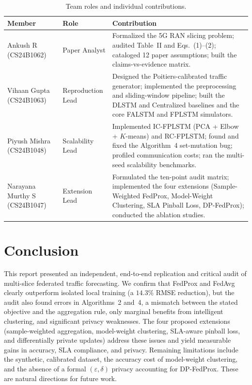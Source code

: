 \documentclass[11pt,a4paper]{article}
\begin{document}
\begin{table}[htbp]
\centering
\small
\caption{Team roles and individual contributions.}
\label{tab:contributions}
\begin{tabularx}{\textwidth}{@{}l l Y@{}}
\toprule
\textbf{Member} & \textbf{Role} & \textbf{Contribution} \\
\midrule
Ankush R (CS24B1062) & Paper Analyst & Formalized the 5G RAN slicing problem; audited Table~II and Eqs.~(1)--(2); cataloged 12 paper assumptions; built the claims-vs-evidence matrix. \\[3pt]
Vihaan Gupta (CS24B1063) & Reproduction Lead & Designed the Poitiers-calibrated traffic generator; implemented the preprocessing and sliding-window pipeline; built the DLSTM and Centralized baselines and the core FALSTM and FPLSTM simulators. \\[3pt]
Piyush Mishra (CS24B1048) & Scalability Lead & Implemented IC-FPLSTM (PCA + Elbow + $K$-means) and RC-FPLSTM; found and fixed the Algorithm~4 set-mutation bug; profiled communication costs; ran the multi-seed scalability benchmarks. \\[3pt]
Narayana Murthy S (CS24B1047) & Extension Lead & Formulated the ten-point audit matrix; implemented the four extensions (Sample-Weighted FedProx, Model-Weight Clustering, SLA Pinball Loss, DP-FedProx); conducted the ablation studies. \\
\bottomrule
\end{tabularx}
\end{table}

\section{Conclusion}
This report presented an independent, end-to-end replication and critical audit of multi-slice federated traffic forecasting. We confirm that FedProx and FedAvg clearly outperform isolated local training (a $14.3\%$ RMSE reduction), but the audit also found errors in Algorithms~2 and~4, a mismatch between the stated objective and the aggregation rule, only marginal benefits from intelligent clustering, and significant privacy weaknesses. The four proposed extensions (sample-weighted aggregation, model-weight clustering, SLA-aware pinball loss, and differentially private updates) address these issues and yield measurable gains in accuracy, SLA compliance, and privacy. Remaining limitations include the synthetic, calibrated dataset, the accuracy cost of model-weight clustering, and the absence of a formal $(\varepsilon,\delta)$ privacy accounting for DP-FedProx. These are natural directions for future work.
\end{document}
